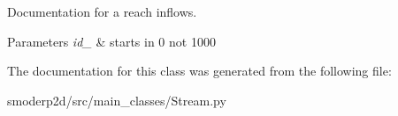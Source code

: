 Documentation for a reach inflows. 


\begin{DoxyParams}{Parameters}
{\em id\-\_\-} & starts in 0 not 1000 \\
\hline
\end{DoxyParams}


The documentation for this class was generated from the following file\-:\begin{DoxyCompactItemize}
\item 
smoderp2d/src/main\-\_\-classes/Stream.\-py\end{DoxyCompactItemize}
